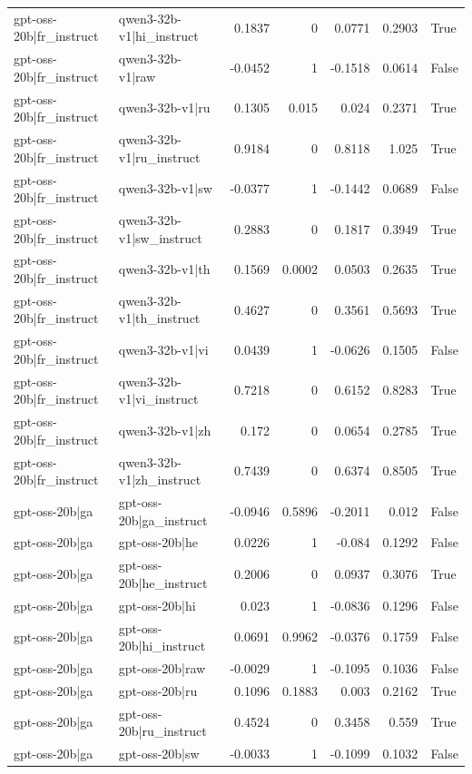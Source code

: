\begin{table}
\begin{tabular}{l l r r r r l}
gpt-oss-20b|fr_instruct & qwen3-32b-v1|hi_instruct & 0.1837 & 0 & 0.0771 & 0.2903 & True \\
gpt-oss-20b|fr_instruct & qwen3-32b-v1|raw & -0.0452 & 1 & -0.1518 & 0.0614 & False \\
gpt-oss-20b|fr_instruct & qwen3-32b-v1|ru & 0.1305 & 0.015 & 0.024 & 0.2371 & True \\
gpt-oss-20b|fr_instruct & qwen3-32b-v1|ru_instruct & 0.9184 & 0 & 0.8118 & 1.025 & True \\
gpt-oss-20b|fr_instruct & qwen3-32b-v1|sw & -0.0377 & 1 & -0.1442 & 0.0689 & False \\
gpt-oss-20b|fr_instruct & qwen3-32b-v1|sw_instruct & 0.2883 & 0 & 0.1817 & 0.3949 & True \\
gpt-oss-20b|fr_instruct & qwen3-32b-v1|th & 0.1569 & 0.0002 & 0.0503 & 0.2635 & True \\
gpt-oss-20b|fr_instruct & qwen3-32b-v1|th_instruct & 0.4627 & 0 & 0.3561 & 0.5693 & True \\
gpt-oss-20b|fr_instruct & qwen3-32b-v1|vi & 0.0439 & 1 & -0.0626 & 0.1505 & False \\
gpt-oss-20b|fr_instruct & qwen3-32b-v1|vi_instruct & 0.7218 & 0 & 0.6152 & 0.8283 & True \\
gpt-oss-20b|fr_instruct & qwen3-32b-v1|zh & 0.172 & 0 & 0.0654 & 0.2785 & True \\
gpt-oss-20b|fr_instruct & qwen3-32b-v1|zh_instruct & 0.7439 & 0 & 0.6374 & 0.8505 & True \\
gpt-oss-20b|ga & gpt-oss-20b|ga_instruct & -0.0946 & 0.5896 & -0.2011 & 0.012 & False \\
gpt-oss-20b|ga & gpt-oss-20b|he & 0.0226 & 1 & -0.084 & 0.1292 & False \\
gpt-oss-20b|ga & gpt-oss-20b|he_instruct & 0.2006 & 0 & 0.0937 & 0.3076 & True \\
gpt-oss-20b|ga & gpt-oss-20b|hi & 0.023 & 1 & -0.0836 & 0.1296 & False \\
gpt-oss-20b|ga & gpt-oss-20b|hi_instruct & 0.0691 & 0.9962 & -0.0376 & 0.1759 & False \\
gpt-oss-20b|ga & gpt-oss-20b|raw & -0.0029 & 1 & -0.1095 & 0.1036 & False \\
gpt-oss-20b|ga & gpt-oss-20b|ru & 0.1096 & 0.1883 & 0.003 & 0.2162 & True \\
gpt-oss-20b|ga & gpt-oss-20b|ru_instruct & 0.4524 & 0 & 0.3458 & 0.559 & True \\
gpt-oss-20b|ga & gpt-oss-20b|sw & -0.0033 & 1 & -0.1099 & 0.1032 & False \\

\end{tabular}
\end{table}
